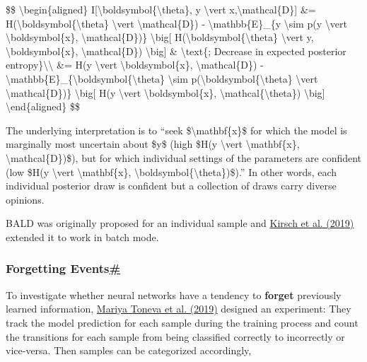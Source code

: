 \$\$ \textbackslash begin\{aligned\} I{[}\textbackslash boldsymbol\{\textbackslash theta\}, y \textbackslash vert x,\textbackslash mathcal\{D\}{]} \&= H(\textbackslash boldsymbol\{\textbackslash theta\} \textbackslash vert \textbackslash mathcal\{D\}) - \textbackslash mathbb\{E\}\_\{y \textbackslash sim p(y \textbackslash vert \textbackslash boldsymbol\{x\}, \textbackslash mathcal\{D\})\} \textbackslash big{[} H(\textbackslash boldsymbol\{\textbackslash theta\} \textbackslash vert y, \textbackslash boldsymbol\{x\}, \textbackslash mathcal\{D\}) \textbackslash big{]} \& \textbackslash text\{; Decrease in expected posterior entropy\}\textbackslash\textbackslash{} \&= H(y \textbackslash vert \textbackslash boldsymbol\{x\}, \textbackslash mathcal\{D\}) - \textbackslash mathbb\{E\}\_\{\textbackslash boldsymbol\{\textbackslash theta\} \textbackslash sim p(\textbackslash boldsymbol\{\textbackslash theta\} \textbackslash vert \textbackslash mathcal\{D\})\} \textbackslash big{[} H(y \textbackslash vert \textbackslash boldsymbol\{x\}, \textbackslash mathcal\{\textbackslash theta\}) \textbackslash big{]} \textbackslash end\{aligned\} \$\$

The underlying interpretation is to ``seek \$\textbackslash mathbf\{x\}\$ for which the model is marginally most uncertain about \$y\$ (high \$H(y \textbackslash vert \textbackslash mathbf\{x\}, \textbackslash mathcal\{D\})\$), but for which individual settings of the parameters are confident (low \$H(y \textbackslash vert \textbackslash mathbf\{x\}, \textbackslash boldsymbol\{\textbackslash theta\})\$).'' In other words, each individual posterior draw is confident but a collection of draws carry diverse opinions.

BALD was originally proposed for an individual sample and \href{https://arxiv.org/abs/1906.08158}{Kirsch et al. (2019)} extended it to work in batch mode.

\subsubsection{\texorpdfstring{Forgetting Events\hyperref[forgetting-events]{\#}}{Forgetting Events\#}}\label{forgetting-events}

To investigate whether neural networks have a tendency to \textbf{forget} previously learned information, \href{https://arxiv.org/abs/1812.05159}{Mariya Toneva et al. (2019)} designed an experiment: They track the model prediction for each sample during the training process and count the transitions for each sample from being classified correctly to incorrectly or vice-versa. Then samples can be categorized accordingly,

